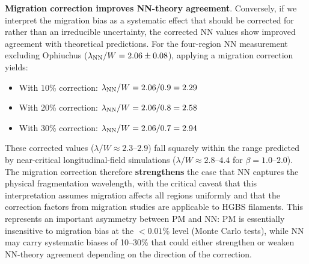 \documentclass[twoside,twocolumn]{mnras}
\begin{document}
\textbf{Migration correction improves NN-theory agreement}. Conversely, if we interpret the migration bias as a systematic effect that should be corrected for rather than an irreducible uncertainty, the corrected NN values show improved agreement with theoretical predictions. For the four-region NN measurement excluding Ophiuchus ($\lambda_{\rm NN}/W = 2.06 \pm 0.08$), applying a migration correction yields:
\begin{itemize}
    \item With 10\% correction: $\lambda_{\rm NN}/W = 2.06 / 0.9 = 2.29$
    \item With 20\% correction: $\lambda_{\rm NN}/W = 2.06 / 0.8 = 2.58$
    \item With 30\% correction: $\lambda_{\rm NN}/W = 2.06 / 0.7 = 2.94$
\end{itemize}
These corrected values ($\lambda/W \approx 2.3$--$2.9$) fall squarely within the range predicted by near-critical longitudinal-field simulations ($\lambda/W \approx 2.8$--$4.4$ for $\beta = 1.0$--$2.0$). The migration correction therefore \textbf{strengthens} the case that NN captures the physical fragmentation wavelength, with the critical caveat that this interpretation assumes migration affects all regions uniformly and that the correction factors from migration studies are applicable to HGBS filaments. This represents an important asymmetry between PM and NN: PM is essentially insensitive to migration bias at the $<0.01$\% level (Monte Carlo tests), while NN may carry systematic biases of 10--30\% that could either strengthen or weaken NN-theory agreement depending on the direction of the correction.
\end{document}
